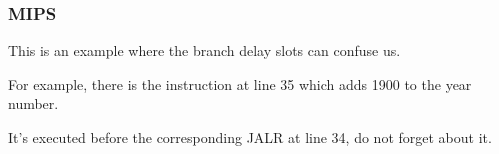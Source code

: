 \subsubsection{MIPS}



This is an example where the branch delay slots can confuse us.

For example, there is the instruction  at line 35 which adds 1900 to the year number.

It's executed before the corresponding JALR at line 34, do not forget about it.

